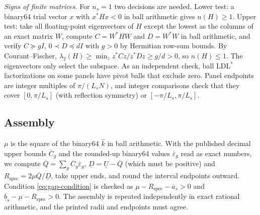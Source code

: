 \emph{Signs of finite matrices.} For $n_s=1$ two decisions are needed. Lower test: a
binary64 trial vector $x$ with $x^*Hx<0$ in ball arithmetic gives $n(H)\ge1$. Upper
test: take all floating-point eigenvectors of $H$ except the lowest as the columns
of an exact matrix $W$, compute $C=W^*HW$ and $D=W^*W$ in ball arithmetic, and verify
$C\succeq gI$, $0\prec D\preceq dI$ with $g>0$ by Hermitian row-sum bounds. By
Courant--Fischer, $\lambda_2(H)\ge\min_z z^*Cz/z^*Dz\ge g/d>0$, so $n(H)\le1$. The
eigenvectors only select the subspace. As an independent check, ball LDL$^*$
factorizations on some panels have pivot balls that exclude zero. Panel endpoints
are integer multiples of $\pi/(L_sN)$, and integer comparisons check that they cover
$[0,\pi/L_s]$ (with reflection symmetry) or $[-\pi/L_s,\pi/L_s]$.

\subsection{Assembly}\label{sm:assembly}
$\mu$ is the square of the binary64 $\widehat k$ in ball arithmetic. With the published
decimal upper bounds $\overline C_g$ and the rounded-up binary64 values
$\overline\varepsilon_g$ read as exact numbers, we compute
$\overline Q=\sum_g\overline C_g\overline\varepsilon_g$, $\underline D=\underline U-
\overline Q$ (which must be positive) and $R_{\mathrm{spec}}=2\mu\overline Q/\underline D$,
take upper ends, and round the interval endpoints outward. Condition
\eqref{eq:gap-condition} is checked as $\mu-R_{\mathrm{spec}}-\overline a_s>0$ and
$\underline b_s-\mu-R_{\mathrm{spec}}>0$. The assembly is repeated independently in
exact rational arithmetic, and the printed radii and endpoints must agree.
